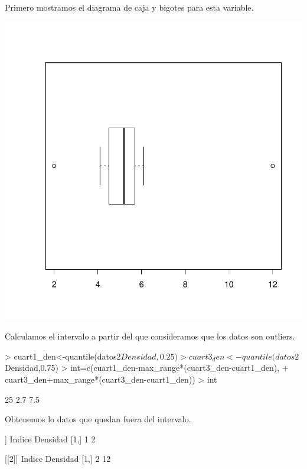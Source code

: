 \documentclass [a4paper] {article}
\begin{document}
Primero mostramos el diagrama de caja y bigotes para esta variable.
\begin{center}
\includegraphics{entrega-plot_caja_bigotes}
\end{center}

Calculamos el intervalo a partir del que consideramos que los datos son outliers.
\begin{Schunk}
\begin{Sinput}
> cuart1_den<-quantile(datos2$Densidad,0.25)
> cuart3_den<-quantile(datos2$Densidad,0.75)
> int=c(cuart1_den-max_range*(cuart3_den-cuart1_den), 
+       cuart3_den+max_range*(cuart3_den-cuart1_den))
> int
\end{Sinput}
\begin{Soutput}
25%
2.7 7.5 
\end{Soutput}
\end{Schunk}

Obtenemos lo datos que quedan fuera del intervalo.
\begin{Schunk}
\begin{Soutput}
[[1]]
     Indice Densidad
[1,]      1        2

[[2]]
     Indice Densidad
[1,]      2       12
\end{Soutput}
\end{Schunk}
\end{document}
